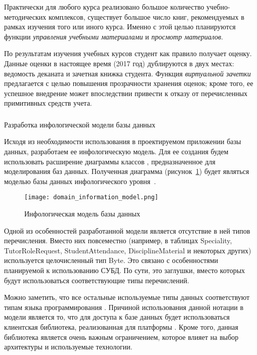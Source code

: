 Практически для любого курса реализовано большое количество учеб\-но-методических комплексов, существует большое число книг, рекомендуемых в рамках изучения того или иного курса. Именно с этой целью планируются функции \emph{управления учебными материалами} и \emph{просмотр материалов}.

По результатам изучения учебных курсов студент как правило получает оценку. Данные оценки в настоящее время (2017 год) дублируются в двух местах: ведомость деканата и зачетная книжка студента. Функция \emph{виртуальной зачетки} предлагается с целью повышения прозрачности хранения оценок; кроме того, ее успешное внедрение может впоследствии привести к отказу от перечисленных примитивных средств учета.

\subsubsection{} Разработка инфологической модели базы данных
\label{sec:domain:model:db}

Исходя из необходимости использования в проектируемом приложении базы данных, разработаем ее инфологическую модель. Для ее создания будем использовать расширение диаграммы классов \uml, предназначенное для моделирования баз данных. Полученная диаграмма (рисунок~\ref{fig:domain:model:db:model}) будет являться моделью базы данных инфологического уровня~\cite{kulikov_db_workbook}.

\begin{figure}
\centering
	\texttt{[image: domain\_information\_model.png]}
	\caption{Инфологическая модель базы данных}
	\label{fig:domain:model:db:model}
\end{figure}

Одной из особенностей разработанной модели является отсутствие в ней типов перечисления. Вместо них повсеместно (например, в таблицах Speciality, TutorRoleRequest, StudentAttendance, DisciplineMaterial и некоторых других) используется целочисленный тип Byte. Это связано с особенностями планируемой к использованию СУБД. По сути, это заглушки, вместо которых будут использоваться соответствующие типы перечислений.

Можно заметить, что все остальные используемые типы данных соответствуют типам языка программирования \csharp. Причиной использования данной нотации в модели является то, что для доступа к базе данных будет использоваться клиентская библиотека, реализованная для платформы \dotnet. Кроме того, данная библиотека является очень важным ограничением, которое влияет на выбор архитектуры и используемые технологии.

